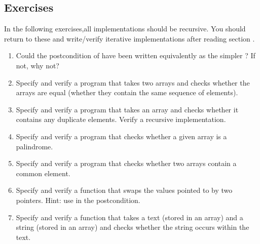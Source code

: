 \subsection{Exercises}
\label{sect:recursiveExercises}
In the following exercises,all implementations should be recursive. You should return to these
and write/verify iterative implementations after reading section .
\begin{enumerate}
\item
Could the postcondition of  have been written equivalently
as the simpler ? If not, why not?
\item
Specify and verify a program that takes two arrays and checks whether
the arrays are equal (\ie whether they contain the same sequence of
elements). 
\item
Specify and verify a program that takes an array and checks whether it
contains any duplicate elements. Verify a recursive implementation.
\item
Specify and verify a program that checks whether a given array
is a palindrome. 
\item
Specify and verify a program that checks whether two arrays contain a
common element.
\item
Specify and verify a function that swaps the values pointed to
by two  pointers. Hint: use  in the
postcondition.
\item 
Specify and verify a function that takes a text (stored in an array) and a string
(stored in an array) and checks whether the string occurs within the
text.
\end{enumerate}



